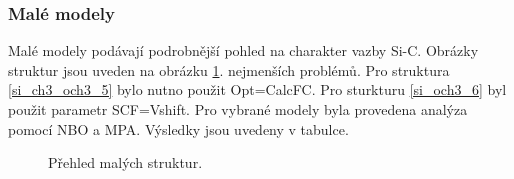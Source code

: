 \documentclass[
  digital, %
  table,   %
  lof,     %
  lot,     %
]{fithesis3}
\begin{document}
\subsubsection{Malé modely}
Malé modely podávají podrobnější pohled na charakter vazby Si-C. Obrázky struktur jsou uveden na obrázku \ref{prehled_male_modely}. nejmenších problémů. Pro struktura \ref{si_ch3_och3_5} bylo nutno použit Opt=CalcFC. Pro sturkturu \ref{si_och3_6} byl použit parametr SCF=Vshift. Pro vybrané modely byla provedena analýza pomocí NBO a MPA. Výsledky jsou uvedeny v tabulce.
\begin{figure}
\begin{center}
\caption{Přehled malých struktur.}
\label{prehled_male_modely}

\end{center}
\end{figure}
\end{document}
